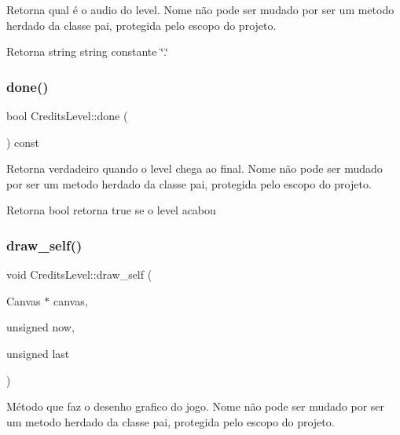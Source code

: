 Retorna qual é o audio do level. Nome não pode ser mudado por ser um metodo herdado da classe pai, protegida pelo escopo do projeto. 

\begin{DoxyReturn}{Retorna}
string string constante \char`\"{}.\char`\"{} 
\end{DoxyReturn}
\mbox{\label{classCreditsLevel_a80b93759949ba662627b52d0a51325ce}} 
\subsubsection{\texorpdfstring{done()}{done()}}
{\footnotesize\ttfamily bool Credits\+Level\+::done (\begin{DoxyParamCaption}{ }\end{DoxyParamCaption}) const}



Retorna verdadeiro quando o level chega ao final. Nome não pode ser mudado por ser um metodo herdado da classe pai, protegida pelo escopo do projeto. 

\begin{DoxyReturn}{Retorna}
bool retorna \textquotesingle{}true\textquotesingle{} se o level acabou 
\end{DoxyReturn}
\mbox{\label{classCreditsLevel_af980e138ebbad6f73b3835f38ee4dfe6}} 
\subsubsection{\texorpdfstring{draw\+\_\+self()}{draw\_self()}}
{\footnotesize\ttfamily void Credits\+Level\+::draw\+\_\+self (\begin{DoxyParamCaption}\item[{Canvas $\ast$}]{canvas,  }\item[{unsigned}]{now,  }\item[{unsigned}]{last }\end{DoxyParamCaption})\hspace{0.3cm}{\ttfamily [protected]}}



Método que faz o desenho grafico do jogo. Nome não pode ser mudado por ser um metodo herdado da classe pai, protegida pelo escopo do projeto. 


